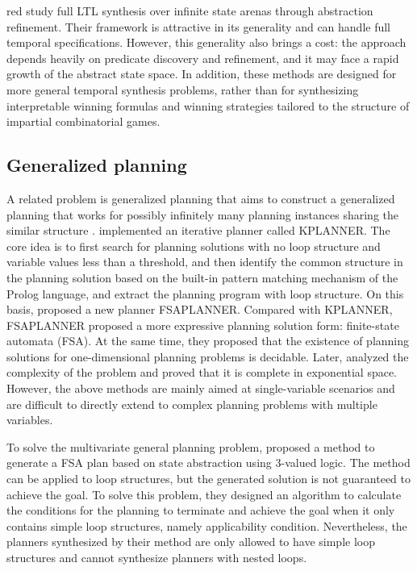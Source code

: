 \documentclass[review]{elsarticle}
\begin{document}
\begin{color}{red}
\citet{AzzopardiPDS2025} study full LTL synthesis over infinite state arenas through abstraction refinement. 
Their framework is attractive in its generality and can handle full temporal specifications. 
However, this generality also brings a cost: the approach depends heavily on predicate discovery and refinement, and it may face a rapid growth of the abstract state space. 
In addition, these methods are designed for more general temporal synthesis problems, rather than for synthesizing interpretable winning formulas and winning strategies tailored to the structure of impartial combinatorial games.
\end{color}

\subsection{Generalized planning} 
A related problem is generalized planning that aims to construct a generalized planning that works for possibly infinitely many planning instances sharing the similar structure \cite{Lev2005}.
\citet{Lev2005} implemented an iterative planner called KPLANNER. The core idea is to first search for planning solutions with no loop structure and variable values less than a threshold, and then identify the common structure in the planning solution based on the built-in pattern matching mechanism of the Prolog language, and extract the planning program with loop structure. On this basis, \citet{HuL2010} proposed a new planner FSAPLANNER. Compared with KPLANNER, FSAPLANNER proposed a more expressive planning solution form: finite-state automata (FSA). At the same time, they proposed that the existence of planning solutions for one-dimensional planning problems is decidable. Later, \citet{HuG2011} analyzed the complexity of the problem and proved that it is complete in exponential space. However, the above methods are mainly aimed at single-variable scenarios and are difficult to directly extend to complex planning problems with multiple variables.

To solve the multivariate general planning problem, \citet{SriIZ2011} proposed a method to generate a FSA plan based on state abstraction using 3-valued logic. The method can be applied to loop structures, but the generated solution is not guaranteed to achieve the goal. To solve this problem, they designed an algorithm to calculate the conditions for the planning to terminate and achieve the goal when it only contains simple loop structures, namely applicability
condition\cite{SriIZ2012}. Nevertheless, the planners synthesized by their method are only allowed to have simple loop structures and cannot synthesize planners with nested loops.
\end{document}
